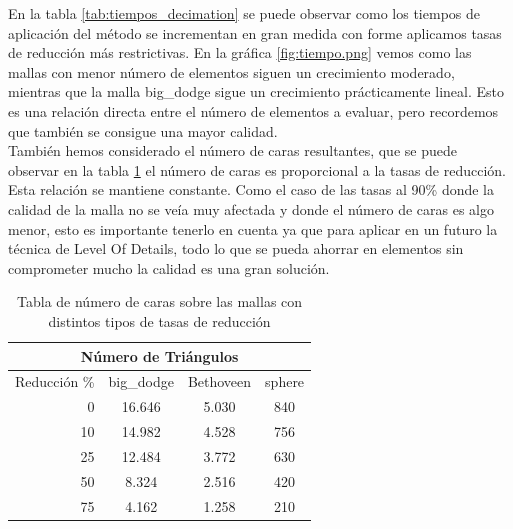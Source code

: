 En la tabla \ref{tab:tiempos_decimation} se puede observar como los tiempos de aplicación del método se incrementan en gran medida con forme aplicamos tasas de reducción más restrictivas. En la gráfica \ref{fig:tiempo.png} vemos como las mallas con menor número de elementos siguen un crecimiento moderado, mientras que la malla big\_dodge sigue un crecimiento prácticamente lineal. Esto es una relación directa entre el número de elementos a evaluar, pero recordemos que también se consigue una mayor calidad.\\

También hemos considerado el número de caras resultantes, que se puede observar en la tabla \ref{tab:caras} el número de caras es proporcional a la tasas de reducción. Esta relación se mantiene constante. Como el caso de las tasas al 90\% donde la calidad de la malla no se veía muy afectada y donde el número de caras es algo menor, esto es importante tenerlo en cuenta ya que para aplicar en un futuro la técnica de Level Of Details, todo lo que se pueda ahorrar en elementos sin comprometer mucho la calidad es una gran solución.

\begin{table}[]
	\centering
	\begin{tabular}{|r|c|c|c|}
		\hline
		\multicolumn{4}{|c|}{Número de Triángulos}                                                                                          \\ \hline
		\multicolumn{1}{|l|}{Reducción \%} & \multicolumn{1}{l|}{big\_dodge} & \multicolumn{1}{l|}{Bethoveen} & \multicolumn{1}{l|}{sphere} \\ \hline
		0                                  & 16.646                          & 5.030                          & 840                         \\ \hline
		10                                 & 14.982                          & 4.528                          & 756                         \\ \hline
		25                                 & 12.484                          & 3.772                          & 630                         \\ \hline
		50                                 & 8.324                           & 2.516                          & 420                         \\ \hline
		75                                 & 4.162                           & 1.258                          & 210                         \\ \hline
	\end{tabular}
	\caption{Tabla de número de caras sobre las mallas con distintos tipos de tasas de reducción}
	\label{tab:caras}
\end{table}


